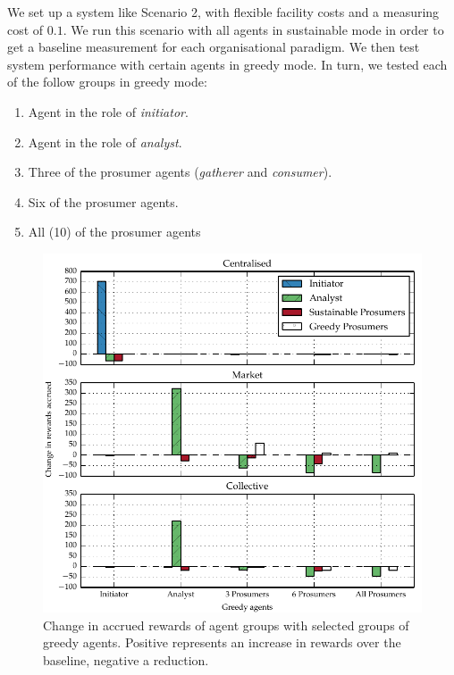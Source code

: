 We set up a system like Scenario 2, with flexible facility costs and a
measuring cost of $0.1$. We run this scenario with all agents in sustainable
mode in order to get a baseline measurement for each organisational paradigm.
We then test system performance with certain agents in greedy mode.
In turn, we tested each of the follow groups in greedy mode:

\begin{enumerate}
\item Agent in the role of \emph{initiator}.
\item Agent in the role of \emph{analyst}.
\item Three of the prosumer agents (\emph{gatherer} and \emph{consumer}).
\item Six of the prosumer agents.
\item All (10) of the prosumer agents
\end{enumerate}

\begin{figure}
\includegraphics{gfx/kc/powerbar.pdf} 
\caption[Change in accrued rewards of agent groups with selected groups of greedy agents.]{Change in accrued rewards of agent groups with selected groups of greedy agents. Positive represents an increase in rewards over the baseline, negative a reduction.}\label{fig:powerbar}
\end{figure}

